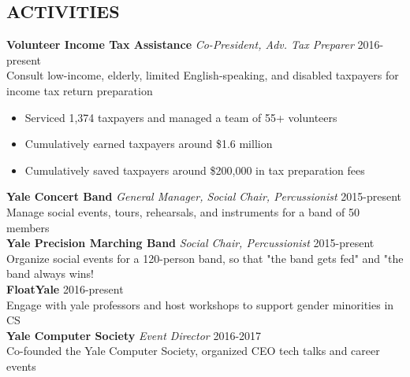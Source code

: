 \documentclass[margin, centered]{res}
\begin{document}
\begin{resume}
  \section{ACTIVITIES}
  \textbf{Volunteer Income Tax Assistance} \textit{Co-President, Adv. Tax Preparer} \hfill 2016-present \\
  Consult low-income, elderly, limited English-speaking, and disabled taxpayers for income tax return preparation
  \begin{itemize}
    \item Serviced 1,374 taxpayers and managed a team of 55+ volunteers
    \item Cumulatively earned taxpayers around \$1.6 million
    \item Cumulatively saved taxpayers around \$200,000 in tax preparation fees
    \end{itemize}
  \textbf{Yale Concert Band} \textit{General Manager, Social Chair, Percussionist} \hfill 2015-present \\
  Manage social events, tours, rehearsals, and instruments for a band of 50 members \\ 
  \textbf{Yale Precision Marching Band} \textit{Social Chair, Percussionist} \hfill 2015-present \\
  Organize social events for a 120-person band, so that "the band gets fed" and "the band always wins! \\ 
  \textbf{FloatYale} \hfill 2016-present \\
  Engage with yale professors and host workshops to support gender minorities in CS \\ 
  \textbf{Yale Computer Society} \textit{Event Director} \hfill 2016-2017 \\
  Co-founded the Yale Computer Society, organized CEO tech talks and career events  

\end{resume}
\end{document}
